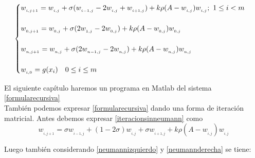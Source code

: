 \begin{equation}
	\label{formularecursiva}
	\displaystyle \begin{cases} w_{_{i,j+1}}=w_{_{i,j}}+\sigma(w_{_{i-1,j}}-2w_{_{i,j}}+w_{_{i+1,j}})+k\rho(A-w_{_{i,j}})w_{_{i,j}}; \,\,1\leq i<m
		
	\vspace{0.5cm} \\
	
	w_{_{0,j+1}}=w_{_{0,j}}+\sigma(2w_{_{1,j}}-2w_{_{0,j}})+k\rho(A-w_{_{0,j}})w_{_{0,j}}
	
	\vspace{0.5cm} \\
	
	
	\vspace{0.5cm}
	w_{_{n,j+1}}=w_{_{n,j}}+\sigma(2w_{_{n-1,j}}-2w_{_{n,j}})+k\rho(A-w_{_{n,j}})w_{_{n,j}}\\
	
	w_{_{i,0}}=g(x_i)\quad 0\leq i\leq m
	\end{cases}
\end{equation}

El siguiente capítulo haremos un programa en Matlab del sistema \eqref{formularecursiva}\\

También podemos expresar \eqref{formularecursiva} dando una forma de iteración matricial. Antes debemos expresar \eqref{iteracionsinneumann} como $$w_{_{i,j+1}}=\sigma w_{_{i-1,j}}+(1-2\sigma)w_{_{i,j}}+\sigma w_{_{i+1,j}}+k\rho(A-w_{_{i,j}})w_{_{i,j}}$$

Luego también considerando \ref{neumannizquierdo} y \eqref{neumannderecha} se tiene:

